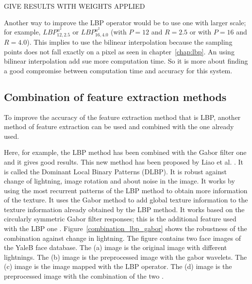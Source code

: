 \noindent GIVE RESULTS WITH WEIGHTS APPLIED
\newline

\noindent Another way to improve the LBP operator would be to use one with larger scale; for example, $ LBP_{12,2.5}^{u^2} $ or $ LBP_{16,4.0}^{u^2} $ (with $ P = 12 $ and $ R = 2.5 $ or with $ P = 16 $ and $ R = 4.0 $). This implies to use the bilinear interpolation because the sampling points does not fall exactly on a pixel as seen in chapter~\ref{chap:lbp}. An using bilinear interpolation add sue more computation time. So it is more about finding a good compromise between computation time and accuracy for this system.
\newline

\subsection{Combination of feature extraction methods}

\vspace{\baselineskip}
\noindent To improve the accuracy of the feature extraction method that is LBP, another method of feature extraction can be used and combined with the one already used. 
\newline

\noindent  Here, for example, the LBP method has been combined with the Gabor filter one and it gives good results. This new method has been proposed by Liao et al. \cite{LIA09}. It is called the Dominant Local Binary Patterns (DLBP). It is robust against change of lightning, image rotation and about noise in the image.  It works by using the most recurrent patterns of the LBP method to obtain more information of the texture. It uses the Gabor method to add global texture information to the texture information already obtained by the LBP method. It works based on the circularly symmetric Gabor filter responses; this is the additional feature used with the LBP one \cite{LIA09}. Figure~\ref{combination_lbp_gabor} shows the robustness of the combination against change in lightning. The figure contains two face images of the YaleB face database. The (a) image is the original image with different lightnings. The (b) image is the preprocessed image with the gabor wavelets. The (c) image is the image mapped with the LBP operator. The (d) image is the preprocessed image with the combination of the two \cite{GOH11}.
\newline

